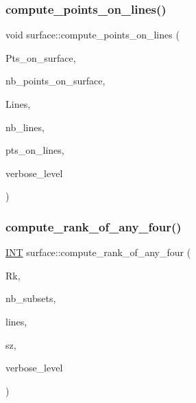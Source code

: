 \mbox{\label{classsurface_a5d2684ccddd35781211c364a2d5980e5}} 
\subsubsection{\texorpdfstring{compute\+\_\+points\+\_\+on\+\_\+lines()}{compute\_points\_on\_lines()}}
{\footnotesize\ttfamily void surface\+::compute\+\_\+points\+\_\+on\+\_\+lines (\begin{DoxyParamCaption}\item[{\mbox{\hyperlink{galois_8h_a09fddde158a3a20bd2dcadb609de11dc}{I\+NT}} $\ast$}]{Pts\+\_\+on\+\_\+surface,  }\item[{\mbox{\hyperlink{galois_8h_a09fddde158a3a20bd2dcadb609de11dc}{I\+NT}}}]{nb\+\_\+points\+\_\+on\+\_\+surface,  }\item[{\mbox{\hyperlink{galois_8h_a09fddde158a3a20bd2dcadb609de11dc}{I\+NT}} $\ast$}]{Lines,  }\item[{\mbox{\hyperlink{galois_8h_a09fddde158a3a20bd2dcadb609de11dc}{I\+NT}}}]{nb\+\_\+lines,  }\item[{\mbox{\hyperlink{classset__of__sets}{set\+\_\+of\+\_\+sets}} $\ast$\&}]{pts\+\_\+on\+\_\+lines,  }\item[{\mbox{\hyperlink{galois_8h_a09fddde158a3a20bd2dcadb609de11dc}{I\+NT}}}]{verbose\+\_\+level }\end{DoxyParamCaption})}

\mbox{\label{classsurface_ae3236300d48c6b9129fcc63fd6979fc1}} 
\subsubsection{\texorpdfstring{compute\+\_\+rank\+\_\+of\+\_\+any\+\_\+four()}{compute\_rank\_of\_any\_four()}}
{\footnotesize\ttfamily \mbox{\hyperlink{galois_8h_a09fddde158a3a20bd2dcadb609de11dc}{I\+NT}} surface\+::compute\+\_\+rank\+\_\+of\+\_\+any\+\_\+four (\begin{DoxyParamCaption}\item[{\mbox{\hyperlink{galois_8h_a09fddde158a3a20bd2dcadb609de11dc}{I\+NT}} $\ast$\&}]{Rk,  }\item[{\mbox{\hyperlink{galois_8h_a09fddde158a3a20bd2dcadb609de11dc}{I\+NT}} \&}]{nb\+\_\+subsets,  }\item[{\mbox{\hyperlink{galois_8h_a09fddde158a3a20bd2dcadb609de11dc}{I\+NT}} $\ast$}]{lines,  }\item[{\mbox{\hyperlink{galois_8h_a09fddde158a3a20bd2dcadb609de11dc}{I\+NT}}}]{sz,  }\item[{\mbox{\hyperlink{galois_8h_a09fddde158a3a20bd2dcadb609de11dc}{I\+NT}}}]{verbose\+\_\+level }\end{DoxyParamCaption})}

